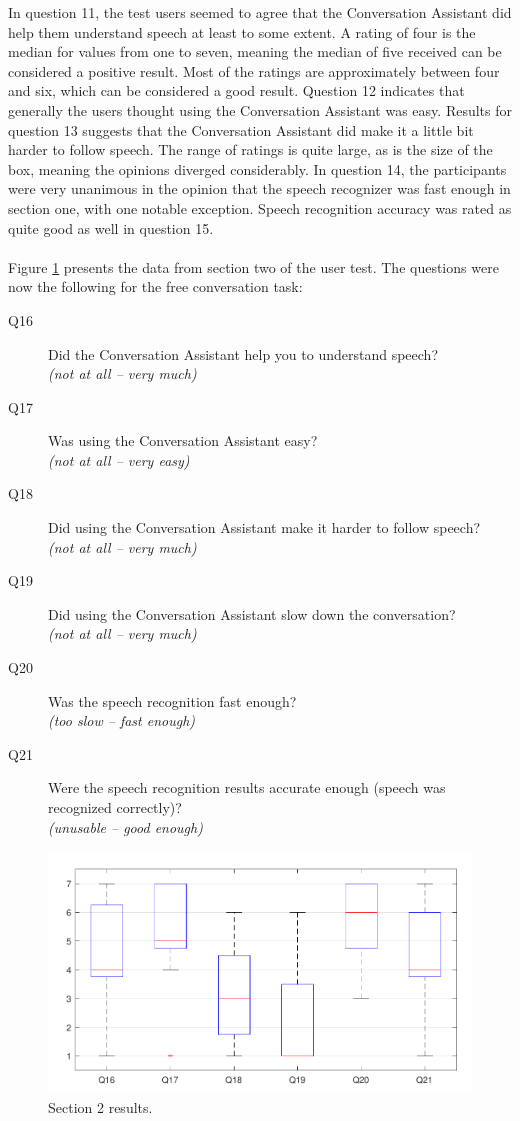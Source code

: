 \documentclass[english, 12pt, a4paper, pdftex, elec, utf8]{aaltothesis}
\begin{document}
In question 11, the test users seemed to agree that the Conversation Assistant did help them understand speech at least to some extent. A rating of four is the median for values from one to seven, meaning the median of five received can be considered a positive result. Most of the ratings are approximately between four and six, which can be considered a good result. Question 12 indicates that generally the users thought using the Conversation Assistant was easy. Results for question 13 suggests that the Conversation Assistant did make it a little bit harder to follow speech. The range of ratings is quite large, as is the size of the box, meaning the opinions diverged considerably. In question 14, the participants were very unanimous in the opinion that the speech recognizer was fast enough in section one, with one notable exception. Speech recognition accuracy was rated as quite good as well in question 15. \\\\
Figure \ref{fig:results3} presents the data from section two of the user test. The questions were now the following for the free conversation task:
\begin{description}
	\item[Q16] Did the Conversation Assistant help you to understand speech? \\ \textit{(not at all -- very much)}
	\item[Q17] Was using the Conversation Assistant easy? \\ \textit{(not at all -- very easy)}
	\item[Q18] Did using the Conversation Assistant make it harder to follow speech? \\ \textit{(not at all -- very much)}
	\item[Q19] Did using the Conversation Assistant slow down the conversation? \\ \textit{(not at all  -- very much)}
	\item[Q20] Was the speech recognition fast enough? \\ \textit{(too slow -- fast enough)}
	\item[Q21] Were the speech recognition results accurate enough (speech was recognized correctly)? \\ \textit{(unusable -- good enough)}
\end{description}
\begin{figure}[h!]
	\centering
	\includegraphics[width=\textwidth]{T2_box3.pdf}
	\caption{Section 2 results.}
	\label{fig:results3} 
\end{figure}
\end{document}

